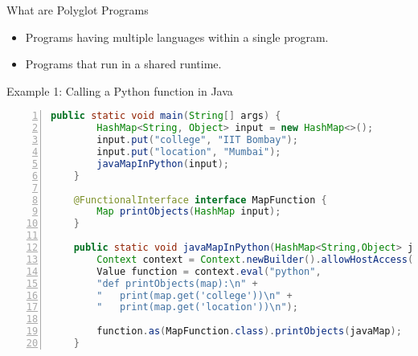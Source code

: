 
\begin{frame}{What are Polyglot Programs}
    \begin{itemize}
        \item Programs having multiple languages within a single program.
        \vspace{3mm}
        \item Programs that run in a shared runtime.
        \vspace{3mm}
    \end{itemize}
\end{frame}

\begin{frame}[fragile]{Example 1: Calling a Python function in Java}
    \begin{center}
        \begin{minipage}{0.8\textwidth} %
        \begin{lstlisting}[language=java,
            frame=single,
            label={lst:pythonInJava},
            numbers=left,
            basicstyle=\tiny\ttfamily,
            caption={Passing java's HashMap object to python},
            captionpos=b,
            backgroundcolor=\color{lightgray},   % Background color
            numberstyle=\color{pink},            % Line number color
            keywordstyle=\color{keywordcolor}\bfseries, % Keywords color
            commentstyle=\color{commentcolor},   % Comment color
            stringstyle=\color{stringcolor}      % String color
        ]
    public static void main(String[] args) {
        HashMap<String, Object> input = new HashMap<>();
        input.put("college", "IIT Bombay");
        input.put("location", "Mumbai");
        javaMapInPython(input);
    }

    @FunctionalInterface interface MapFunction {
        Map printObjects(HashMap input);
    }

    public static void javaMapInPython(HashMap<String,Object> javaMap) {
        Context context = Context.newBuilder().allowHostAccess(true).build();
        Value function = context.eval("python",
        "def printObjects(map):\n" +
        "   print(map.get('college'))\n" +
        "   print(map.get('location'))\n");

        function.as(MapFunction.class).printObjects(javaMap);
    }
        \end{lstlisting}
        \end{minipage}
    \end{center}
\end{frame}

